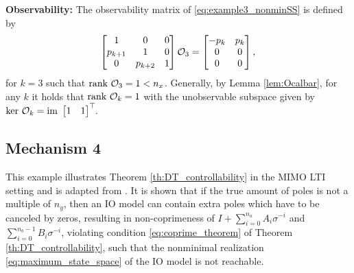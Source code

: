 \textbf{Observability:} The observability matrix of \eqref{eq:example3_nonminSS} is defined by 
\begin{equation}
    \begin{bmatrix} 1 & 0 & 0 \\ p_{k+1} & 1 & 0 \\ 0 & p_{k+2} & 1 \end{bmatrix}\mathcal{O}_3 = \begin{bmatrix} -p_k & p_k \\ 0 & 0 \\ 0 & 0 \end{bmatrix},
\end{equation}
for $k=3$ such that $\textrm{rank} \ \mathcal{O}_3 = 1 < n_x$. Generally, by Lemma \ref{lem:Ocalbar}, for any $k$ it holds that $\textrm{rank} \ \mathcal{O}_k = 1$ with the unobservable subspace given by $\ker\ \Ocal_k = \im\ \begin{bmatrix} 1 & 1 \end{bmatrix}^\T$.



\subsection{Mechanism 4}
This example illustrates Theorem \ref{th:DT_controllability} in the MIMO LTI setting and is adapted from \cite{Alsalti2023}. It is shown that if the true amount of poles is not a multiple of $n_y$, then an IO model can contain extra poles which have to be canceled by zeros, resulting in non-coprimeness of $I+\sum_{i=0}^{n_a} A_i \sigma^{-i}$ and $\sum_{i=0}^{n_b-1} B_i \sigma^{-i}$, violating condition \eqref{eq:coprime_theorem} of Theorem \ref{th:DT_controllability}, such that the nonminimal realization \eqref{eq:maximum_state_space} of the IO model is not reachable.

